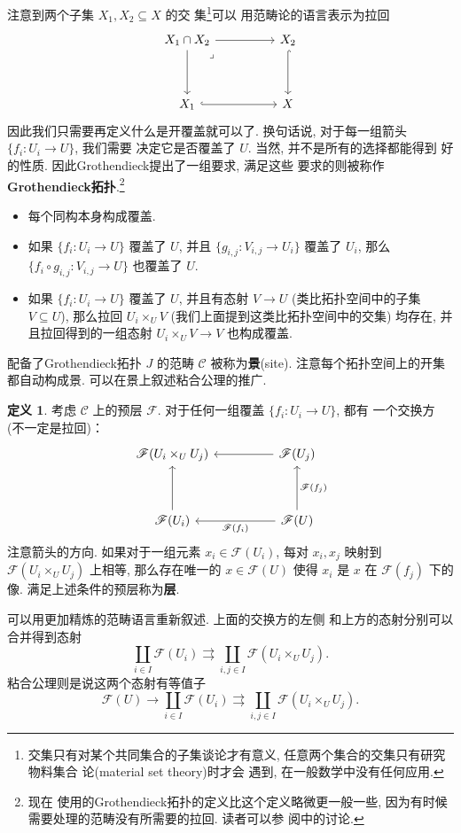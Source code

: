 \documentclass[UTF8]{ctexbook}
\theoremstyle{plain}
\theoremstyle{definition}
\newtheorem{definition}{定义}[chapter]
\theoremstyle{remark}
\begin{document}
注意到两个子集 \(X_1, X_2 \subseteq X\) 的交
集\footnote{交集只有对某个共同集合的子集谈论才有意义,
任意两个集合的交集只有研究物料集合
论(material set theory)时才会
遇到, 在一般数学中没有任何应用.}可以
用范畴论的语言表示为拉回
\[\begin{tikzcd}
{X_1 \cap X_2} && {X_2} \\
\\
{X_1} && X
\arrow[hook, from=3-1, to=3-3]
\arrow[hook, from=1-3, to=3-3]
\arrow[from=1-1, to=3-1]
\arrow[from=1-1, to=1-3]
\arrow["\lrcorner"{anchor=center, pos=0.125}, draw=none, from=1-1, to=3-3]
\end{tikzcd}\]
因此我们只需要再定义什么是开覆盖就可以了. 换句话说,
对于每一组箭头 \(\{f_i : U_i \to U\}\), 我们需要
决定它是否覆盖了 \(U\). 当然, 并不是所有的选择都能得到
好的性质. 因此Grothendieck提出了一组要求, 满足这些
要求的则被称作\textbf{Grothendieck拓扑}.\footnote{现在
使用的Grothendieck拓扑的定义比这个定义略微更一般一些,
因为有时候需要处理的范畴没有所需要的拉回. 读者可以参
阅\cite{johnstone:2008:elephant}中的讨论.}
\begin{itemize}
\item 每个同构本身构成覆盖.
\item 如果 \(\{f_i : U_i \to U\}\) 覆盖了 \(U\),
并且 \(\{g_{i,j} : V_{i,j} \to U_i\}\) 覆盖了 \(U_i\), 那么
\(\{f_i \circ g_{i,j} : V_{i,j} \to U\}\) 也覆盖了 \(U\).
\item 如果 \(\{f_i : U_i \to U\}\) 覆盖了 \(U\),
并且有态射 \(V \to U\) (类比拓扑空间中的子集 \(V \subseteq U\)),
那么拉回 \(U_i \times_U V\) (我们上面提到这类比拓扑空间中的交集)
均存在, 并且拉回得到的一组态射
\(U_i \times_U V \to V\) 也构成覆盖.
\end{itemize}
配备了Grothendieck拓扑 \(J\) 的范畴 \(\mathcal C\)
被称为\textbf{景}(site). 注意每个拓扑空间上的开集
都自动构成景. 可以在景上叙述粘合公理的推广.
\begin{definition}
考虑 \(\mathcal C\) 上的预层 \(\mathscr F\).
对于任何一组覆盖 \(\{f_i : U_i \to U\}\), 都有
一个交换方 (不一定是拉回)：
\[\begin{tikzcd}
{\mathscr F(U_i \times_U U_j)} && {\mathscr F(U_j)} \\
\\
{\mathscr F(U_i)} && {\mathscr F(U)}
\arrow["{\mathscr F(f_i)}", from=3-3, to=3-1]
\arrow["{\mathscr F(f_j)}"', from=3-3, to=1-3]
\arrow[from=3-1, to=1-1]
\arrow[from=1-3, to=1-1]
\end{tikzcd}\]
注意箭头的方向. 如果对于一组元素 \(x_i \in \mathscr F(U_i)\),
每对 \(x_i, x_j\) 映射到 \(\mathscr F(U_i \times_U U_j)\)
上相等, 那么存在唯一的 \(x \in \mathscr F(U)\) 使得
\(x_i\) 是 \(x\) 在 \(\mathscr F(f_j)\) 下的像.
满足上述条件的预层称为\textbf{层}.
\end{definition}
可以用更加精炼的范畴语言重新叙述. 上面的交换方的左侧
和上方的态射分别可以合并得到态射
\[\coprod_{i \in I} \mathscr F(U_i)
\rightrightarrows \coprod_{i,j \in I} \mathscr F(U_i \times_U U_j).\]
粘合公理则是说这两个态射有等值子
\[\mathscr F(U) \to \coprod_{i \in I} \mathscr F(U_i)
\rightrightarrows \coprod_{i,j \in I} \mathscr F(U_i \times_U U_j).\]
\end{document}
